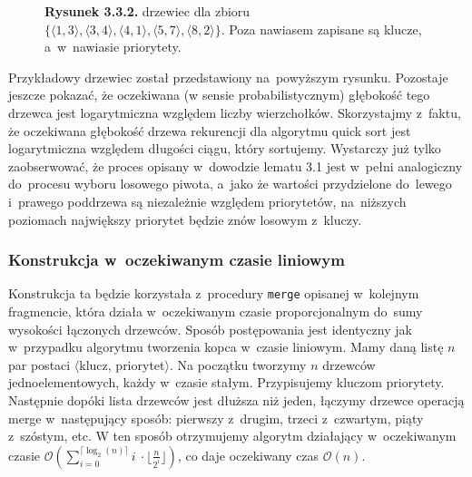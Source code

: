 \documentclass[declaration,shortabstract]{iithesis}
\theoremstyle{definition} \newtheorem{definition}{Definicja}[chapter]
\theoremstyle{plain} \newtheorem{remark}[definition]{Obserwacja}
\theoremstyle{plain} \newtheorem{theorem}[definition]{Twierdzenie}
\theoremstyle{plain} \newtheorem{example}{Przykład}[definition]
\theoremstyle{plain} \newtheorem{lemma}[definition]{Lemat}
\begin{document}
\begin{figure}[h]
    \begin{center}
        \caption*{\textbf{Rysunek 3.3.2.} drzewiec dla zbioru $\{ \langle 1, 3 \rangle, \langle 3, 4 \rangle, \langle 4, 1 \rangle, \langle 5, 7 \rangle, \langle 8, 2 \rangle \}$. Poza nawiasem zapisane są klucze, a~w~nawiasie priorytety.}
    \end{center}
\end{figure}

Przykładowy drzewiec został przedstawiony na~powyższym rysunku. Pozostaje jeszcze pokazać, że oczekiwana (w sensie probabilistycznym) głębokość tego drzewca jest logarytmiczna względem liczby wierzchołków. Skorzystajmy z~faktu, że oczekiwana głębokość drzewa rekurencji dla algorytmu quick sort jest logarytmiczna względem długości ciągu, który sortujemy. Wystarczy już tylko zaobserwować, że proces opisany w~dowodzie lematu 3.1 jest w~pełni analogiczny do~procesu wyboru losowego piwota, a~jako że wartości przydzielone do~lewego i~prawego poddrzewa są niezależnie względem priorytetów, na~niższych poziomach największy priorytet będzie znów losowym z~kluczy.

\subsubsection{Konstrukcja w~oczekiwanym czasie liniowym}

Konstrukcja ta będzie korzystała z~procedury \texttt{merge} opisanej w~kolejnym fragmencie, która działa w~oczekiwanym czasie proporcjonalnym do~sumy wysokości łączonych drzewców. Sposób postępowania jest identyczny jak w~przypadku algorytmu tworzenia kopca w~czasie liniowym. Mamy daną listę $n$ par postaci $\langle$klucz, priorytet$\rangle$. Na początku tworzymy $n$ drzewców jednoelementowych, każdy w~czasie stałym. Przypisujemy kluczom priorytety. Następnie dopóki lista drzewców jest dłuższa niż jeden, łączymy drzewce operacją merge w~następujący sposób: pierwszy z~drugim, trzeci z~czwartym, piąty z~szóstym, etc. W ten sposób otrzymujemy algorytm działający w~oczekiwanym czasie $\mathcal{O}( \sum_{i=0}^{\lceil \log_{2}(n) \rceil} i~\cdot \lfloor \frac{n}{2^i} \rfloor)$, co daje oczekiwany czas $\mathcal{O}(n)$.
\end{document}
